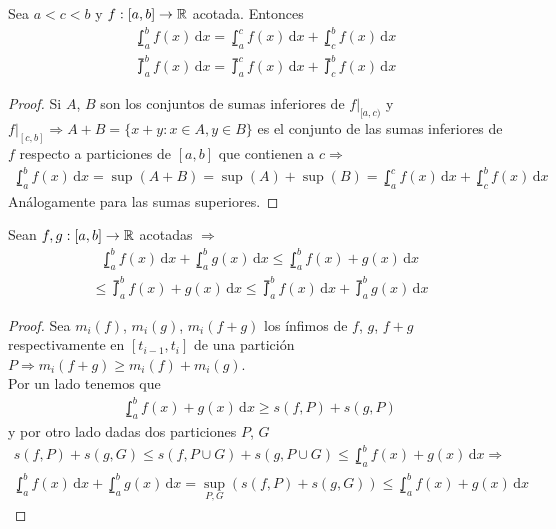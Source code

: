 \begin{theorem}
  Sea \(a < c < b\) y \(f: [a, b] \to \mathbb{R} \) acotada. Entonces \begin{align*}
     & \lowint_a^b f(x)\,\mathrm{d}x = \lowint_a^c f(x)\,\mathrm{d}x + \lowint_c^b f(x)\,\mathrm{d}x \\
     & \upint_a^b f(x)\, \mathrm{d}x = \upint_a^c f(x)\, \mathrm{d}x + \upint_c^b f(x)\, \mathrm{d}x
  \end{align*}

  \begin{proof}
    Si \(A\), \(B\) son los conjuntos de sumas inferiores de \(f|_{[a, c)} \) y \( f|_{[c, b]} \Rightarrow A + B = \{ x+y : x \in A, y \in B \} \) es el conjunto de las sumas inferiores de \(f\) respecto a particiones
    de \([a, b]\) que contienen a \(c \Rightarrow \) \begin{align*}
      \lowint_a^b f(x)\,\mathrm{d}x = \sup(A+B) = \sup(A) + \sup(B) = \lowint_a^c f(x)\,\mathrm{d}x + \lowint_c^b f(x)\,\mathrm{d}x
    \end{align*}
    Análogamente para las sumas superiores.
  \end{proof}
\end{theorem}

\begin{prop}
  Sean \(f, g: [a, b] \to \mathbb{R} \) acotadas \(\Rightarrow \)
  \begin{align*}
    \lowint_a^b f(x)\,\mathrm{d}x + \lowint_a^b g(x)\,\mathrm{d}x \leq \lowint_a^b f(x)+g(x)\,\mathrm{d}x
  \end{align*}
  \begin{align*}
    \leq \upint_a^b f(x) + g(x)\, \mathrm{d}x \leq \upint_a^b f(x)\, \mathrm{d}x + \upint_a^b g(x)\, \mathrm{d}x
  \end{align*}
  \begin{proof}
    Sea \(m_i(f)\), \(m_i(g)\), \(m_i(f+g)\) los ínfimos de \(f\), \(g\), \(f+g\) respectivamente en \([t_{i-1}, t_i]\) de una partición \(P \Rightarrow m_i(f+g) \geq m_i(f) + m_i(g)\). \\
    Por un lado tenemos que \begin{align*}
      \lowint_a^b f(x)+g(x)\, \mathrm{d}x \geq s(f, P) + s(g, P)
    \end{align*} y por otro lado dadas dos particiones \(P\), \(G\) \begin{align*}
      s(f, P) + s(g, G) \leq s(f, P \cup G) + s(g, P \cup G) \leq \lowint_a^b f(x)+g(x)\,\mathrm{d}x \Rightarrow
    \end{align*}
    \begin{align*}
      \lowint_a^b f(x) \, \mathrm{d}x + \lowint_a^b g(x) \, \mathrm{d}x = \sup_{P, G}(s(f, P)+s(g, G)) \leq \lowint_a^b f(x) + g(x)\, \mathrm{d}x
    \end{align*}
  \end{proof}
\end{prop}

